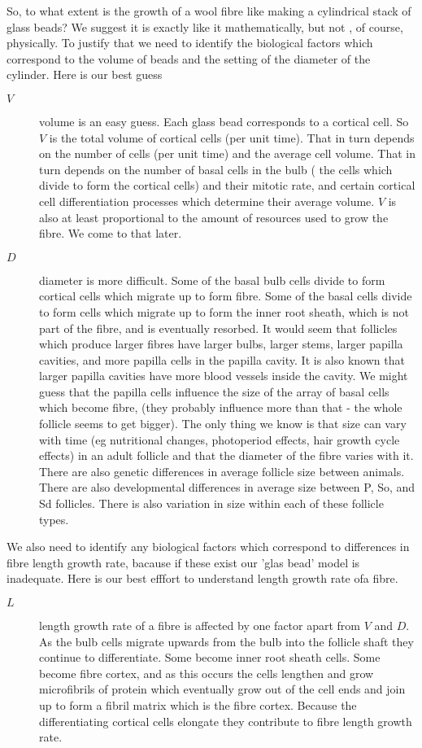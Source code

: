\documentclass[titlepage]{article}  %
\begin{document}
So, to what extent is the growth of a wool fibre like making a cylindrical stack of glass beads? We suggest it is exactly like it mathematically, but not , of course, physically. To justify that we need to identify the biological factors which correspond to the volume of beads and the setting of the diameter of the cylinder. Here is our best guess
\begin{description}
\item[$V$] volume is an easy guess. Each glass bead corresponds to a cortical cell. So $V$ is the total volume of cortical cells (per unit time). That in turn depends on the number of cells (per unit time) and the average cell volume. That in turn depends on the number of basal cells in the bulb ( the cells which divide to form the cortical cells) and their mitotic rate, and certain cortical cell differentiation processes which determine their average volume. $V$ is also at least proportional to the amount of resources used to grow the fibre. We come to that later.
\item[$D$] diameter is more difficult. Some of the basal bulb cells divide to form cortical cells which migrate up to form fibre. Some of the basal cells divide to form cells which migrate up to form the inner root sheath, which is not part of the fibre, and is eventually resorbed. It would seem that follicles which produce larger fibres have larger bulbs, larger stems, larger papilla cavities, and more papilla cells in the papilla cavity. It is also known that larger papilla cavities have more blood vessels inside the cavity.  We might guess that the papilla cells influence the size of the array of basal cells which become fibre, (they probably influence more than that - the whole follicle seems to get bigger). The only thing we know is that size can vary with time (eg nutritional changes, photoperiod effects, hair growth cycle effects) in an adult follicle and that the diameter of the fibre varies with it. There are also genetic differences in  average follicle size between animals.  There are also developmental differences in average size between P, So, and Sd follicles. There is also variation in size within each of these follicle types.
\end{description}

We also need to identify any biological factors which correspond to differences in fibre length growth rate, bacause if these exist our 'glas bead' model is inadequate. Here is our best efffort to understand length growth rate ofa fibre.
\begin{description}
\item[$L$] length growth rate of a fibre is affected by one factor apart from $V$ and $D$. As the bulb cells migrate upwards from the bulb into the follicle shaft they continue to differentiate. Some become inner root sheath cells. Some become fibre cortex, and as this occurs the cells lengthen and grow microfibrils of protein which eventually grow out of the cell ends and join up to form a fibril matrix which is the fibre cortex. Because the differentiating cortical cells elongate they contribute to fibre length growth rate. 
\end{description}
\end{document}
